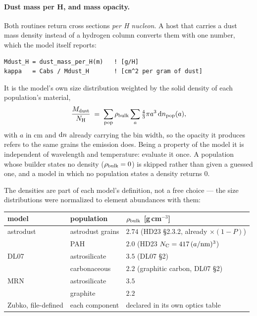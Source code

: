 \documentclass{my_memo}
\begin{document}
\paragraph{Dust mass per H, and mass opacity.} Both routines
return cross sections \emph{per H nucleon}. A host that carries a dust mass
density instead of a hydrogen column converts them with one number, which the
model itself reports:
\begin{lstlisting}
Mdust_H = dust_mass_per_H(m)   ! [g/H]
kappa   = Cabs / Mdust_H       ! [cm^2 per gram of dust]
\end{lstlisting}
It is the model's own size distribution weighted by the solid density of each
population's material,
\begin{equation}
\frac{M_{\rm dust}}{N_{\rm H}}
  \;=\; \sum_{\rm pop} \rho_{\rm bulk}
        \sum_a \tfrac43\pi a^3\,{\rm d}n_{\rm pop}(a),
\label{eq:massperh}
\end{equation}
with $a$ in cm and ${\rm d}n$ already carrying the bin width, so the opacity it
produces refers to the same grains the emission does. Being a property of the
model it is independent of wavelength and temperature: evaluate it once. A
population whose builder states no density ($\rho_{\rm bulk}=0$) is skipped
rather than given a guessed one, and a model in which no population states a
density returns $0$.

The densities are part of each model's definition, not a free choice --- the
size distributions were normalized to element abundances with them:

\begin{center}
\begin{tabular}{@{}lll@{}}
\toprule
model & population & $\rho_{\rm bulk}$ [g\,cm$^{-3}$] \\
\midrule
astrodust  & astrodust grains & $2.74$ (HD23 \S2.3.2, already $\times(1-P)$) \\
           & PAH              & $2.0$ (HD23 $N_{\rm C}=417\,(a/{\rm nm})^3$) \\
DL07       & astrosilicate    & $3.5$ (DL07 \S2) \\
           & carbonaceous     & $2.2$ (graphitic carbon, DL07 \S2) \\
MRN        & astrosilicate    & $3.5$ \\
           & graphite         & $2.2$ \\
Zubko, file-defined & each component & declared in its own optics table \\
\bottomrule
\end{tabular}
\end{center}
\end{document}
